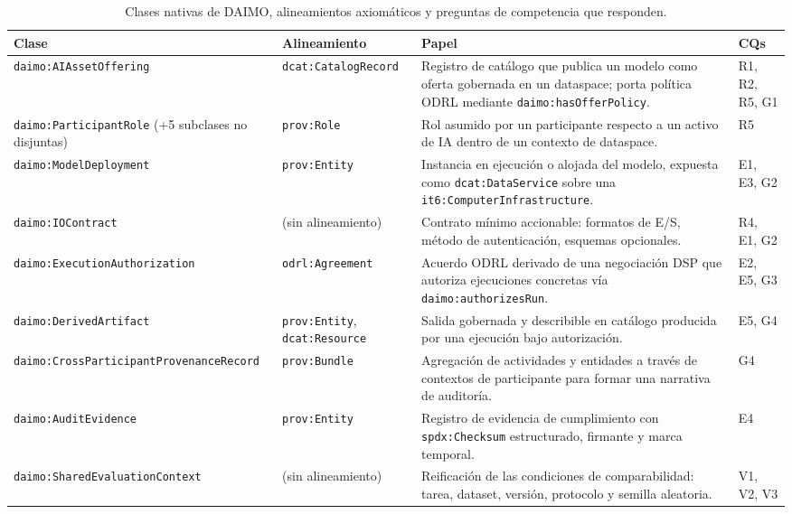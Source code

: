 \documentclass[11pt,a4paper]{article}
\newcommand{\code}[1]{\texttt{#1}}
\begin{document}
\begin{table}[t]
\small\sf\centering
\caption{Clases nativas de DAIMO, alineamientos axiomáticos y preguntas de competencia que responden.\label{tab:classes}}
\begin{tabular}{@{}p{4cm}p{3cm}p{6cm}p{2.2cm}@{}}
\toprule
\textbf{Clase} & \textbf{Alineamiento} & \textbf{Papel} & \textbf{CQs} \\
\midrule
\code{daimo:AIAssetOffering} & \code{dcat:CatalogRecord} & Registro de catálogo que publica un modelo como oferta gobernada en un dataspace; porta política ODRL mediante \code{daimo:hasOfferPolicy}. & R1, R2, R5, G1 \\
\code{daimo:ParticipantRole} \newline (+5 subclases no disjuntas) & \code{prov:Role} & Rol asumido por un participante respecto a un activo de IA dentro de un contexto de dataspace. & R5 \\
\code{daimo:ModelDeployment} & \code{prov:Entity} & Instancia en ejecución o alojada del modelo, expuesta como \code{dcat:DataService} sobre una \code{it6:ComputerInfrastructure}. & E1, E3, G2 \\
\code{daimo:IOContract} & (sin alineamiento) & Contrato mínimo accionable: formatos de E/S, método de autenticación, esquemas opcionales. & R4, E1, G2 \\
\code{daimo:ExecutionAuthorization} & \code{odrl:Agreement} & Acuerdo ODRL derivado de una negociación DSP que autoriza ejecuciones concretas vía \code{daimo:authorizesRun}. & E2, E5, G3 \\
\code{daimo:DerivedArtifact} & \code{prov:Entity}, \code{dcat:Resource} & Salida gobernada y describible en catálogo producida por una ejecución bajo autorización. & E5, G4 \\
\code{daimo:CrossParticipantProvenanceRecord} & \code{prov:Bundle} & Agregación de actividades y entidades a través de contextos de participante para formar una narrativa de auditoría. & G4 \\
\code{daimo:AuditEvidence} & \code{prov:Entity} & Registro de evidencia de cumplimiento con \code{spdx:Checksum} estructurado, firmante y marca temporal. & E4 \\
\code{daimo:SharedEvaluationContext} & (sin alineamiento) & Reificación de las condiciones de comparabilidad: tarea, dataset, versión, protocolo y semilla aleatoria. & V1, V2, V3 \\
\bottomrule
\end{tabular}
\end{table}
\end{document}
